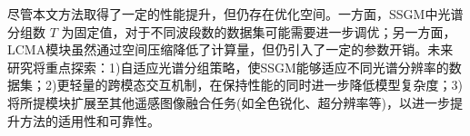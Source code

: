 \documentclass[UTF8,a4paper,11pt]{ctexart}
\begin{document}
尽管本文方法取得了一定的性能提升，但仍存在优化空间。一方面，SSGM中光谱分组数 $T$ 为固定值，对于不同波段数的数据集可能需要进一步调优；另一方面，LCMA模块虽然通过空间压缩降低了计算量，但仍引入了一定的参数开销。未来研究将重点探索：1)自适应光谱分组策略，使SSGM能够适应不同光谱分辨率的数据集；2)更轻量的跨模态交互机制，在保持性能的同时进一步降低模型复杂度；3)将所提模块扩展至其他遥感图像融合任务(如全色锐化、超分辨率等)，以进一步提升方法的适用性和可靠性。

\vspace{8pt}

\vspace{6pt}

\vspace{6pt}
\end{document}
